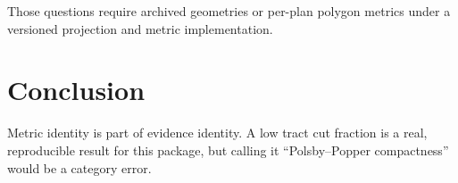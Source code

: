 Those questions require archived geometries or per-plan polygon metrics under a
versioned projection and metric implementation.

\section{Conclusion}

Metric identity is part of evidence identity. A low tract cut fraction is a
real, reproducible result for this package, but calling it ``Polsby--Popper
compactness'' would be a category error.

